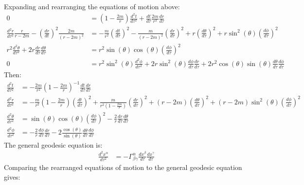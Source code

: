 \documentclass[a4paper]{article}
\begin{document}
\subsection{}
Expanding and rearranging the equations of motion above:
\begin{align*}
	0 &= \left(1-\frac{2m}{r}\right) \frac{d^2 t}{d\tau^2}  + \frac{dt}{d\tau} \frac{2m}{r^2} \frac{dr}{d\tau} \\
	\frac{d^2r}{d\tau^2} \frac{r}{r-2m} - \left(\frac{dr}{dt}\right)^2 \frac{2m}{(r-2m)^2}&=   -\frac{m}{r^2} \left(\frac{dt}{d\tau} \right)^2 - \frac{m}{(r-2m)^2}  \left(\frac{dr}{d\tau} \right)^2 + r  \left(\frac{d\theta}{d\tau} \right)^2  + r\sin^2(\theta)  \left(\frac{d\phi}{d\tau} \right)^2 \\
	r^2 \frac{d^2\theta}{d\tau^2} + 2r \frac{dr}{d\tau} \frac{d\theta}{d\tau}  &= r^2 \sin(\theta)\cos(\theta) \left( \frac{d\phi}{d\tau} \right)^2 \\
	0 &= r^2 \sin^2(\theta) \frac{d^2\phi}{d\tau^2} + 2r \sin^2(\theta) \frac{d\phi}{d\tau}\frac{dr}{d\tau} + 2r^2 \cos(\theta) \sin(\theta) \frac{d\theta}{d\tau} \frac{d\phi}{d\tau}
\end{align*}
Then:
\begin{align*}
	\frac{d^2 t}{d\tau^2} &= - \frac{2m}{r^2} \left(1-\frac{2m}{r}\right)^{-1} \frac{dt}{d\tau}  \frac{dr}{d\tau}\\
	\frac{d^2r}{d\tau^2} &=   -\frac{m}{r^2} \left(1-\frac{2m}{r}\right) \left(\frac{dt}{d\tau} \right)^2 + \frac{m}{r^2\left(1-\frac{2m}{r}\right)}  \left(\frac{dr}{d\tau} \right)^2 + (r - 2m)  \left(\frac{d\theta}{d\tau} \right)^2  + (r - 2m)\sin^2(\theta)  \left(\frac{d\phi}{d\tau} \right)^2\\
	\frac{d^2\theta}{d\tau^2}  &= \sin(\theta)\cos(\theta) \left( \frac{d\phi}{d\tau} \right)^2 - \frac{2}{r} \frac{dr}{d\tau} \frac{d\theta}{d\tau} \\
	 \frac{d^2\phi}{d\tau^2} &= - \frac{2}{r}  \frac{d\phi}{d\tau}\frac{dr}{d\tau} - 2 \frac{\cos(\theta)}{ \sin(\theta)} \frac{d\theta}{d\tau} \frac{d\phi}{d\tau}
\end{align*}
The general geodesic equation is:
\begin{align*}
\frac{d^2 x^\alpha}{d\tau^2} &= -\Gamma^\alpha_{\beta \gamma} \frac{dx^\beta}{d\tau}\frac{dx^\gamma}{d\tau}
\end{align*}
Comparing the rearranged equations of motion to the general geodesic equation gives:
\end{document}
